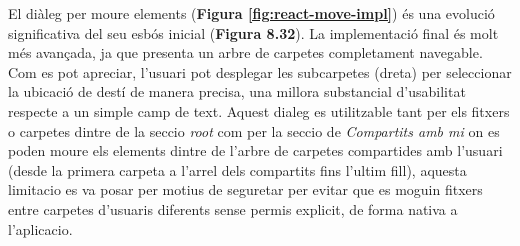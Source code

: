 El diàleg per moure elements (\textbf{Figura \ref{fig:react-move-impl}}) és una evolució significativa del seu esbós inicial (\textbf{Figura 8.32}). La implementació final és molt més avançada, ja que presenta un arbre de carpetes completament navegable. Com es pot apreciar, l'usuari pot desplegar les subcarpetes (dreta) per seleccionar la ubicació de destí de manera precisa, una millora substancial d'usabilitat respecte a un simple camp de text. Aquest dialeg es utilitzable tant per els fitxers o carpetes dintre de la seccio \textit{root} com per la seccio de \textit{Compartits amb mi} on es poden moure els elements dintre de l'arbre de carpetes compartides amb l'usuari (desde la primera carpeta a l'arrel dels compartits fins l'ultim fill), aquesta limitacio es va posar per motius de seguretar per evitar que es moguin fitxers entre carpetes d'usuaris diferents sense permis explicit, de forma nativa a l'aplicacio.

